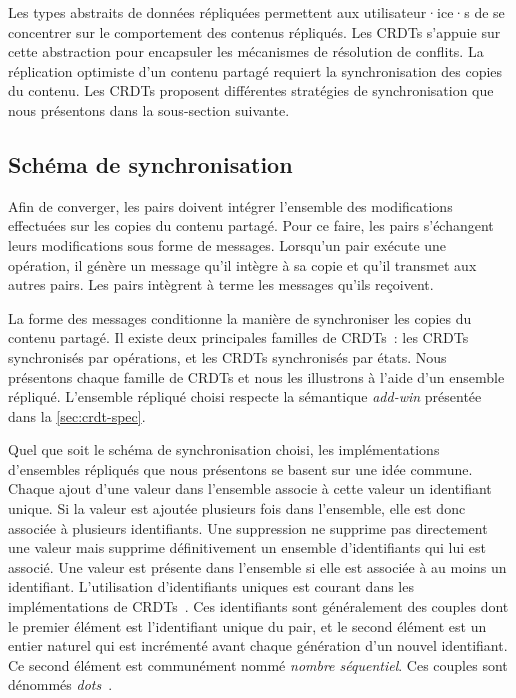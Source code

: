 Les types abstraits de données répliquées permettent aux utilisateur·ice·s de se concentrer sur le comportement des contenus répliqués.
Les \acp{CRDT} s'appuie sur cette abstraction pour encapsuler les mécanismes de résolution de conflits.
La réplication optimiste d'un contenu partagé requiert la synchronisation des copies du contenu.
Les \acp{CRDT} proposent différentes stratégies de synchronisation que nous présentons dans la sous-section suivante.


\subsection{Schéma de synchronisation}\label{sec:crdt-sync}

Afin de converger, les pairs doivent intégrer l'ensemble des modifications effectuées sur les copies du contenu partagé.
Pour ce faire, les pairs s'échangent leurs modifications sous forme de messages.
Lorsqu'un pair exécute une opération, il génère un message qu'il intègre à sa copie et qu'il transmet aux autres pairs.
Les pairs intègrent à terme les messages qu'ils reçoivent.

La forme des messages conditionne la manière de synchroniser les copies du contenu partagé.
Il existe deux principales familles de \acp{CRDT}~: les \acp{CRDT} synchronisés par opérations, et les \acp{CRDT} synchronisés par états.
Nous présentons chaque famille de \acp{CRDT} et nous les illustrons à l'aide d'un ensemble répliqué.
L'ensemble répliqué choisi respecte la sémantique \emph{add-win} présentée dans la \autoref{sec:crdt-spec}.

Quel que soit le schéma de synchronisation choisi, les implémentations d'ensembles répliqués que nous présentons se basent sur une idée commune.
Chaque ajout d'une valeur dans l'ensemble associe à cette valeur un identifiant unique.
Si la valeur est ajoutée plusieurs fois dans l'ensemble, elle est donc associée à plusieurs identifiants.
Une suppression ne supprime pas directement une valeur mais supprime définitivement un ensemble d'identifiants qui lui est associé.
Une valeur est présente dans l'ensemble si elle est associée à au moins un identifiant.
L'utilisation d'identifiants uniques est courant dans les implémentations de \acp{CRDT}~\autocite{baquero_2018_pure-op-crdt,almeida_2018_delta-crdt-revisited}.
Ces identifiants sont généralement des couples dont le premier élément est l'identifiant unique du pair, et le second élément est un entier naturel qui est incrémenté avant chaque génération d'un nouvel identifiant.
Ce second élément est communément nommé \emph{nombre séquentiel}.
Ces couples sont dénommés \emph{dots}~\autocite{baquero_2018_pure-op-crdt}.

